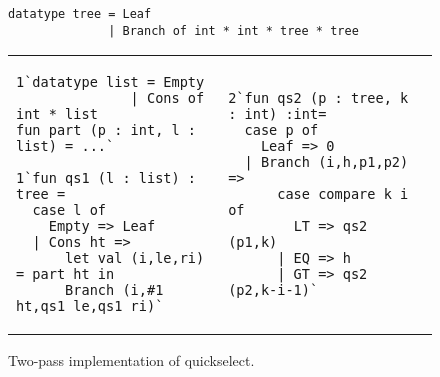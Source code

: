 
\begin{figure}
\begin{lstlisting}
datatype tree = Leaf
              | Branch of int * int * tree * tree

\end{lstlisting}
\begin{tabular}{l|l}
\begin{lstlisting}
1`datatype list = Empty 
              | Cons of int * list
fun part (p : int, l : list) = ...`

1`fun qs1 (l : list) : tree =
  case l of
    Empty => Leaf
  | Cons ht => 
      let val (i,le,ri) = part ht in 
      Branch (i,#1 ht,qs1 le,qs1 ri)`

\end{lstlisting}
\hspace{1ex}
&
\hspace{1ex}
\begin{lstlisting}
2`fun qs2 (p : tree, k : int) :int= 
  case p of
    Leaf => 0
  | Branch (i,h,p1,p2) => 
      case compare k i of
        LT => qs2 (p1,k)
      | EQ => h
      | GT => qs2 (p2,k-i-1)`
\end{lstlisting}
\end{tabular}
\caption{Two-pass implementation of quickselect.}
\label{fig:qs-split}
\end{figure}

